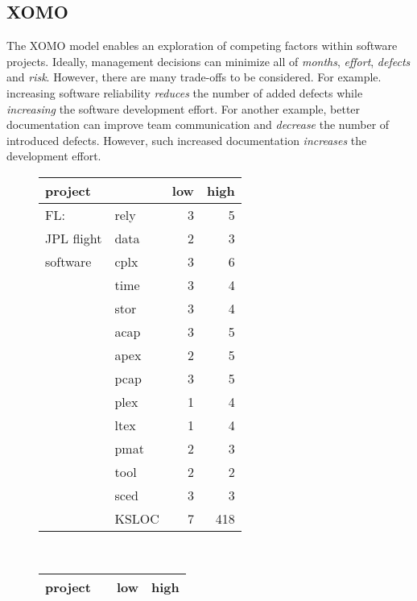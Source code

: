 \subsection{XOMO}


The XOMO model enables an exploration of competing factors 
within software projects. Ideally, management decisions can minimize
all of  {\em months}, {\em
  effort}, {\em defects} and {\em risk}. However, there are many trade-offs to be considered.
For
example.
increasing
software reliability   {\em reduces} the
  number of added defects while {\em increasing} the 
software development effort. For another example,
better documentation can improve team communication and {\em decrease} the number of introduced defects.
However, such increased documentation {\em increases} the development effort.

\begin{figure}[!t]
\scriptsize
\begin{tabular}{l@{~}|l@{~}r@{~}r@{~}}
project&&low&high\\\hline
FL:&rely&3&5\\
JPL flight &data&2&3\\
software&cplx&3&6\\
&time&3&4\\
&stor&3&4\\
&acap&3&5\\
&apex&2&5\\
&pcap&3&5\\
&plex&1&4\\
&ltex&1&4\\
&pmat&2&3\\
&tool&2&2\\
&sced&3&3\\
&KSLOC&7&418
\end{tabular}~~~~~~~~~~~~~~~~~~~~~~\begin{tabular}{l@{~}|l@{~}r@{~}r@{~}}
project&&low&high\\\hline


\end{tabular}
\end{figure}
